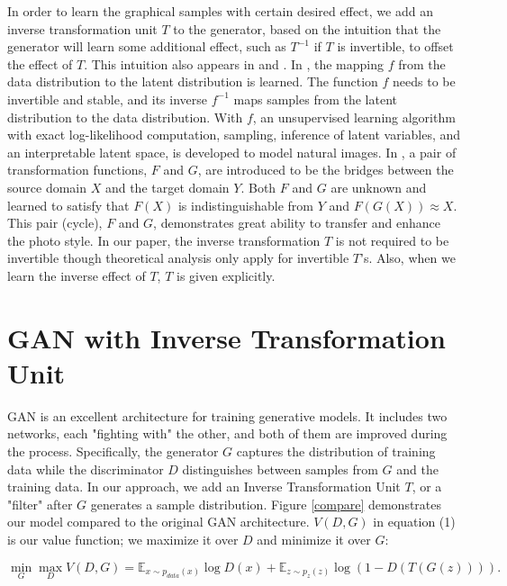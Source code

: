\documentclass{article}
\begin{document}

In order to learn the graphical samples with certain desired effect, we add an inverse transformation unit $T$ to the generator, based on the intuition that the generator will learn some additional effect, such as $T^{-1}$ if $T$ is invertible, to offset the effect of $T$. This intuition also appears in \cite{realNVP} and \cite{cycleGAN}.
In \cite{realNVP}, the mapping $f$ from the data distribution to the latent distribution is learned. The function $f$ needs to be invertible and stable, and its inverse $f^{-1}$ maps samples from the latent distribution to the data distribution. With $f$, an unsupervised learning algorithm with exact log-likelihood computation, sampling, inference of latent variables, and an interpretable latent space, is developed to model natural images.
In \cite{cycleGAN}, a pair of transformation functions, $F$ and $G$, are introduced to be the bridges between the source domain $X$ and the target domain $Y$. Both $F$ and $G$ are unknown and learned to satisfy that $F(X)$ is indistinguishable from $Y$ and $F(G(X))\approx X$. This pair (cycle), $F$ and $G$, demonstrates great ability to transfer and enhance the photo style.
In our paper, the inverse transformation $T$ is not required to be invertible though theoretical analysis only apply for invertible $T$'s. Also, when we learn the inverse effect of $T$, $T$ is given explicitly.




\section{GAN with Inverse Transformation Unit}
GAN \cite{GAN} is an excellent architecture for training generative models. It includes two networks, each "fighting with" the other, and both of them are improved during the process. Specifically, the generator $G$
captures the distribution of training data while the discriminator $D$ distinguishes between samples from $G$ and the training data. In our approach, we add an Inverse Transformation Unit $T$, or a "filter" after $G$ generates a sample distribution. Figure \ref{compare} demonstrates our model compared to the original GAN \cite{GAN} architecture. $V(D,G)$ in equation (1) is our value function; we maximize it over $D$ and minimize it over $G$:



\begin{equation}\min_G\max_D V(D,G)=\mathbb{E}_{x\sim p_{data}(x)}\log D(x)+\mathbb{E}_{z\sim p_z(z)}\log\left(1-D(T(G(z)))\right).\end{equation}
\end{document}
